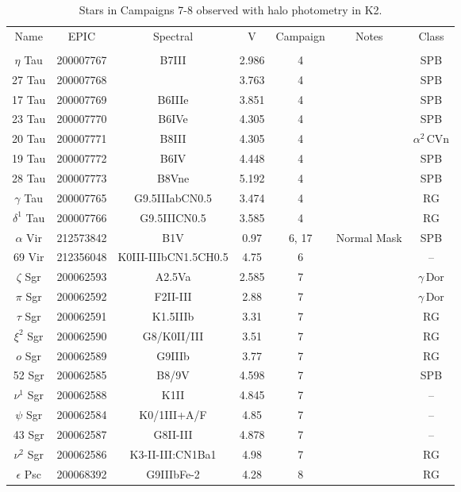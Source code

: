 \begin{table*}
\caption{Stars in Campaigns 7-8 observed with halo photometry in K2.\label{table_0}}
\begin{tabular}{ccccccc}
\hline \hline
Name & EPIC & Spectral & V & Campaign & Notes & Class \\
 &  &  &  &  &  &  \\
\hline
$\eta$ Tau & 200007767 & B7III & 2.986 & 4 & \tablenotemark{a} & SPB \\
27 Tau & 200007768 &  & 3.763 & 4 & \tablenotemark{a} & SPB \\
17 Tau & 200007769 & B6IIIe & 3.851 & 4 & \tablenotemark{a} & SPB \\
23 Tau & 200007770 & B6IVe & 4.305 & 4 & \tablenotemark{a} & SPB \\
20 Tau & 200007771 & B8III & 4.305 & 4 & \tablenotemark{a} & $\alpha^2\,\text{CVn}$ \\
19 Tau & 200007772 & B6IV & 4.448 & 4 & \tablenotemark{a} & SPB \\
28 Tau & 200007773 & B8Vne & 5.192 & 4 & \tablenotemark{a} & SPB \\
$\gamma$ Tau & 200007765 & G9.5IIIabCN0.5 & 3.474 & 4 &  & RG \\
$\delta^{1}$ Tau & 200007766 & G9.5IIICN0.5 & 3.585 & 4 &  & RG \\
$\alpha$ Vir & 212573842 & B1V & 0.97 & 6, 17 & Normal Mask & SPB \\
69 Vir & 212356048 & K0III-IIIbCN1.5CH0.5 & 4.75 & 6 &  & -- \\
$\zeta$ Sgr & 200062593 & A2.5Va & 2.585 & 7 &  & $\gamma\,\text{Dor}$ \\
$\pi$ Sgr & 200062592 & F2II-III & 2.88 & 7 &  & $\gamma\,\text{Dor}$ \\
$\tau$ Sgr & 200062591 & K1.5IIIb & 3.31 & 7 &  & RG \\
$\xi^{2}$ Sgr & 200062590 & G8/K0II/III & 3.51 & 7 &  & RG \\
$o$ Sgr & 200062589 & G9IIIb & 3.77 & 7 &  & RG \\
52 Sgr & 200062585 & B8/9V & 4.598 & 7 &  & SPB \\
$\nu^{1}$ Sgr & 200062588 & K1II & 4.845 & 7 &  & -- \\
$\psi$ Sgr & 200062584 & K0/1III+A/F & 4.85 & 7 &  & -- \\
43 Sgr & 200062587 & G8II-III & 4.878 & 7 &  & -- \\
$\nu^{2}$ Sgr & 200062586 & K3-II-III:CN1Ba1 & 4.98 & 7 &  & RG \\
$\epsilon$ Psc & 200068392 & G9IIIbFe-2 & 4.28 & 8 &  & RG \\

\end{tabular}
\end{table*}
